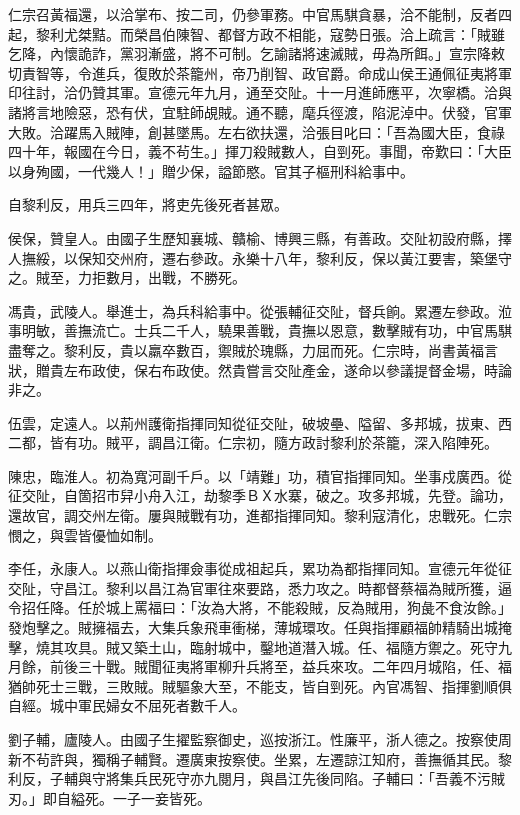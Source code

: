 \begin{pinyinscope}
仁宗召黃福還，以洽掌布、按二司，仍參軍務。中官馬騏貪暴，洽不能制，反者四起，黎利尤桀黠。而榮昌伯陳智、都督方政不相能，寇勢日張。洽上疏言：「賊雖乞降，內懷詭詐，黨羽漸盛，將不可制。乞諭諸將速滅賊，毋為所餌。」宣宗降敕切責智等，令進兵，復敗於茶籠州，帝乃削智、政官爵。命成山侯王通佩征夷將軍印往討，洽仍贊其軍。宣德元年九月，通至交阯。十一月進師應平，次寧橋。洽與諸將言地險惡，恐有伏，宜駐師覘賊。通不聽，麾兵徑渡，陷泥淖中。伏發，官軍大敗。洽躍馬入賊陣，創甚墜馬。左右欲扶還，洽張目叱曰：「吾為國大臣，食祿四十年，報國在今日，義不茍生。」揮刀殺賊數人，自剄死。事聞，帝歎曰：「大臣以身殉國，一代幾人！」贈少保，謚節愍。官其子樞刑科給事中。

自黎利反，用兵三四年，將吏先後死者甚眾。

侯保，贊皇人。由國子生歷知襄城、贛榆、博興三縣，有善政。交阯初設府縣，擇人撫綏，以保知交州府，遷右參政。永樂十八年，黎利反，保以黃江要害，築堡守之。賊至，力拒數月，出戰，不勝死。

馮貴，武陵人。舉進士，為兵科給事中。從張輔征交阯，督兵餉。累遷左參政。涖事明敏，善撫流亡。士兵二千人，驍果善戰，貴撫以恩意，數擊賊有功，中官馬騏盡奪之。黎利反，貴以羸卒數百，禦賊於瑰縣，力屈而死。仁宗時，尚書黃福言狀，贈貴左布政使，保右布政使。然貴嘗言交阯產金，遂命以參議提督金場，時論非之。

伍雲，定遠人。以荊州護衛指揮同知從征交阯，破坡壘、隘留、多邦城，拔東、西二都，皆有功。賊平，調昌江衛。仁宗初，隨方政討黎利於茶籠，深入陷陣死。

陳忠，臨淮人。初為寬河副千戶。以「靖難」功，積官指揮同知。坐事戍廣西。從征交阯，自箇招市舁小舟入江，劫黎季ＢＸ水寨，破之。攻多邦城，先登。論功，還故官，調交州左衛。屢與賊戰有功，進都指揮同知。黎利寇清化，忠戰死。仁宗憫之，與雲皆優恤如制。

李任，永康人。以燕山衛指揮僉事從成祖起兵，累功為都指揮同知。宣德元年從征交阯，守昌江。黎利以昌江為官軍往來要路，悉力攻之。時都督蔡福為賊所獲，逼令招任降。任於城上罵福曰：「汝為大將，不能殺賊，反為賊用，狗彘不食汝餘。」發炮擊之。賊擁福去，大集兵象飛車衝梯，薄城環攻。任與指揮顧福帥精騎出城掩擊，燒其攻具。賊又築土山，臨射城中，鑿地道潛入城。任、福隨方禦之。死守九月餘，前後三十戰。賊聞征夷將軍柳升兵將至，益兵來攻。二年四月城陷，任、福猶帥死士三戰，三敗賊。賊驅象大至，不能支，皆自剄死。內官馮智、指揮劉順俱自經。城中軍民婦女不屈死者數千人。

劉子輔，廬陵人。由國子生擢監察御史，巡按浙江。性廉平，浙人德之。按察使周新不茍許與，獨稱子輔賢。遷廣東按察使。坐累，左遷諒江知府，善撫循其民。黎利反，子輔與守將集兵民死守亦九閱月，與昌江先後同陷。子輔曰：「吾義不污賊刃。」即自縊死。一子一妾皆死。


\end{pinyinscope}
